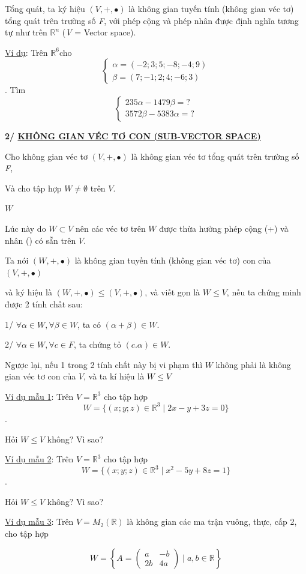\documentclass[12pt,a4paper]{article}
\begin{document}
Tổng quát, ta ký hiệu
$(V, +, \bullet)$ là không gian
tuyến tính (không gian véc tơ) tổng quát trên trường số \emph{F}, với
phép cộng và phép nhân được định nghĩa tương tự như trên
$\mathbb{R}^n$ (\emph{V} =
Vector space).

\ul{Ví dụ}: Trên
$\mathbb{R}^6$cho
\[ \begin{cases} \alpha = (-2; 3; 5; -8; -4; 9) \\ \beta = (7; -1; 2; 4; -6; 3) \end{cases} \]. Tìm
\[ \begin{cases} 235\alpha - 1479\beta = ? \\ 3572\beta - 5383\alpha = ? \end{cases} \]

\textbf{2/ \ul{KHÔNG GIAN VÉC TƠ CON (SUB-VECTOR SPACE)}}

Cho không gian véc tơ
$(V, +, \bullet)$ là không gian
véc tơ tổng quát trên trường số \emph{F},

Và cho tập hợp $W \neq \emptyset$
trên $V$.

$W$

Lúc này do $W \subset V$ nên
các véc tơ trên $W$
được thừa hưởng phép cộng (+) và nhân
()
có sẵn trên $V$.

Ta nói $(W, +, \bullet)$ là không
gian tuyến tính (không gian véc tơ) con của
$(V, +, \bullet)$

và ký hiệu là $(W, +, \bullet) \le (V, +, \bullet)$,
và viết gọn là $W \le V$,
nếu ta chứng minh được 2 tính chất sau:

1/ $\forall \alpha \in W, \forall \beta \in W$, ta có
$(\alpha + \beta) \in W$.

2/ $\forall \alpha \in W, \forall c \in F$, ta chứng tỏ
$(c.\alpha) \in W$.

Ngược lại, nếu 1 trong 2 tính chất này bị vi phạm thì
$W$ không phải là
không gian véc tơ con của
$V$, và ta kí hiệu
là $W \le V$

\ul{Ví dụ mẫu 1}: Trên
$V = \mathbb{R}^3$ cho tập hợp
\[ W = \{(x; y; z) \in \mathbb{R}^3 \mid 2x - y + 3z = 0\} \].

Hỏi $W \le V$ không? Vì
sao?

\ul{Ví dụ mẫu 2}: Trên
$V = \mathbb{R}^3$ cho tập hợp
\[ W = \{(x; y; z) \in \mathbb{R}^3 \mid x^2 - 5y + 8z = 1\} \].

Hỏi $W \le V$ không? Vì
sao?

\ul{Ví dụ mẫu 3}: Trên
$V = M_2(\mathbb{R})$ là không gian
các ma trận vuông, thực, cấp 2, cho tập hợp

\[ W = \left\{ A = \begin{pmatrix} a & -b \\ 2b & 4a \end{pmatrix} \mid a, b \in \mathbb{R} \right\} \]
\end{document}
